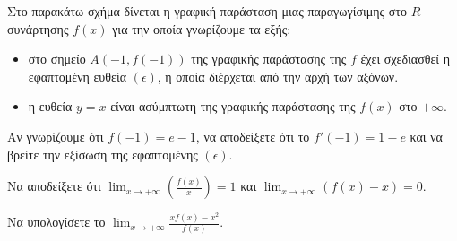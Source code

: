 Στο παρακάτω σχήμα δίνεται η γραφική παράσταση μιας παραγωγίσιμης στο $R$ συνάρτησης $f(x)$ για την οποία γνωρίζουμε τα εξής:
\begin{itemize}
    \item στο σημείο $A(-1, f(-1))$ της γραφικής παράστασης της $f$ έχει σχεδιασθεί η εφαπτομένη ευθεία $(\epsilon)$, η οποία διέρχεται από την αρχή των αξόνων.
    \item η ευθεία $y=x$ είναι ασύμπτωτη της γραφικής παράστασης της $f(x)$ στο $+\infty$.
\end{itemize}

\begin{alist}
    \item Αν γνωρίζουμε ότι $f(-1) = e - 1$, να αποδείξετε ότι το $f'(-1) = 1 - e$ και να βρείτε την εξίσωση της εφαπτομένης $(\epsilon)$. 
    \item Να αποδείξετε ότι $\lim_{x \to +\infty} \left(\frac{f(x)}{x}\right) = 1$ και $\lim_{x \to +\infty} (f(x) - x) = 0$. 
    \item Να υπολογίσετε το $\lim_{x \to +\infty} \frac{xf(x)-x^2}{f(x)}$. 
\end{alist}